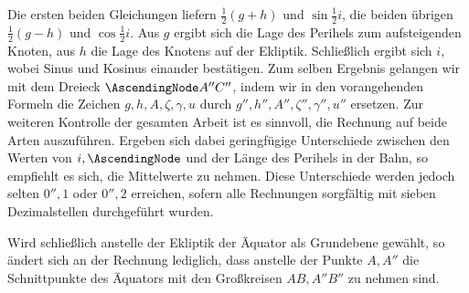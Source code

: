 Die ersten beiden Gleichungen liefern $\tfrac12(g+h)$ und $\sin\tfrac12i$, die beiden übrigen $\tfrac12(g-h)$ und $\cos\tfrac12i$. Aus $g$ ergibt sich die Lage des Perihels zum aufsteigenden Knoten, aus $h$ die Lage des Knotens auf der Ekliptik. Schließlich ergibt sich $i$, wobei Sinus und Kosinus einander bestätigen. Zum selben Ergebnis gelangen wir mit dem Dreieck $\AscendingNode A''C''$, indem wir in den vorangehenden Formeln die Zeichen $g,h,A,\zeta,\gamma,u$ durch $g'',h'',A'',\zeta'',\gamma'',u''$ ersetzen. Zur weiteren Kontrolle der gesamten Arbeit ist es sinnvoll, die Rechnung auf beide Arten auszuführen. Ergeben sich dabei geringfügige Unterschiede zwischen den Werten von $i,\AscendingNode$ und der Länge des Perihels in der Bahn, so empfiehlt es sich, die Mittelwerte zu nehmen. Diese Unterschiede werden jedoch selten $0''{,}1$ oder $0''{,}2$ erreichen, sofern alle Rechnungen sorgfältig mit sieben Dezimalstellen durchgeführt wurden.

Wird schließlich anstelle der Ekliptik der Äquator als Grundebene gewählt, so ändert sich an der Rechnung lediglich, dass anstelle der Punkte $A,A''$ die Schnittpunkte des Äquators mit den Großkreisen $AB,A''B''$ zu nehmen sind.
